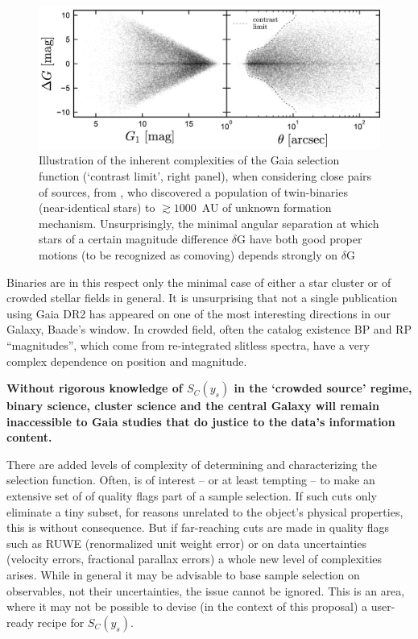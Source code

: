 \begin{figure}[ht!]
    \centering
    \includegraphics[width=0.7\linewidth]{img/BinarySelection_ElBadry.png}
    \caption{Illustration of the inherent complexities of the Gaia selection function (`contrast limit', right panel), when considering close pairs of sources, from \citet{ElBadry2019}, who discovered a population of twin-binaries (near-identical stars) to $\gtrsim 1000$~AU of unknown formation mechanism.
    Unsurprisingly, the minimal angular separation at which stars of a certain magnitude difference $\delta$G have both good proper motions (to be recognized as comoving) depends strongly on $\delta$G}
    \label{fig:binaries}
\end{figure}

Binaries are in this respect only the minimal case of either a star cluster or of crowded stellar fields in general. It is unsurprising that not a single publication using Gaia DR2 has appeared on one of the most interesting directions in our Galaxy, Baade's window.
In crowded field, often the catalog existence BP and RP ``magnitudes'',
which come from re-integrated slitless spectra, have a very complex dependence on position and magnitude.

\textbf{Without rigorous knowledge of $S_C(y_s)$ in the `crowded source' regime, binary science, cluster science and the central Galaxy will remain inaccessible to Gaia studies that do justice to the data's information content.}

There are added levels of complexity of determining and characterizing the selection function. Often, is of interest -- or at least tempting -- to make an extensive set of of quality flags part of a sample selection. If such cuts only eliminate a tiny subset, for reasons unrelated to the object's physical properties, this is without consequence. But if far-reaching cuts are made in quality flags such as RUWE (renormalized unit weight error) or on data uncertainties (velocity errors, fractional parallax errors) a whole new level of complexities arises. While in general it may be advisable to base sample selection on observables, not their uncertainties, the issue cannot be ignored. 
This is an area, where it may not be possible to devise (in the context of this proposal) a user-ready recipe for $S_C(y_s)$.

